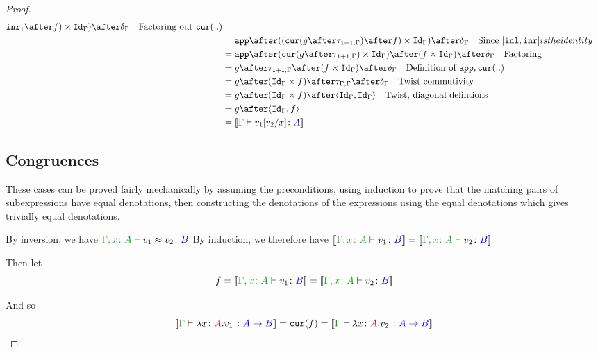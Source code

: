 \documentclass{report}
\begin{document}
\begin{framed}
\begin{proof}
{{\begin{align*}
{                }{
                    \inr_\1
                }\after f)\times \idg)\after\diag{\G}\qt{Factoring out $\cur{..}$}\\
                & = \app\after((\cur{g\after\twist{\1+\1}{\G}}\after f)\times \idg)\after\diag{\G}\qt{Since $\fld{\inl}{\inr} is the identity$}\\
                & = \app\after(\cur{g\after\twist{\1+\1}{\G}}\times \idg)\after (f\times \idg)\after\diag{\G}\qt{Factoring}\\
               & = g\after\twist{\1+\1}{\G} \after (f\times \idg)\after\diag{\G} \qt{Definition of $\app,\cur{..}$}\\
               & = g\after(\idg\times f)\after \twist{\G}{\G} \after\diag{\G} \qt{Twist commutivity}\\
               & = g\after(\idg\times f) \after\pr{\idg}{\idg} \qt{Twist, diagonal defintions} \\
               & = g\after\pr{\idg}{f} \\
               & = \deno{\gtyperelation{v_1\ssub{x}{v_2}}{ A}}
            \end{align*}
            }}
        
        
        \subsection{Congruences}
        These cases can be proved fairly mechanically by assuming the preconditions, using induction to prove that the matching pairs of subexpressions have equal denotations, then constructing the denotations of the expressions using the equal denotations which gives trivially equal denotations.
        
        \case{\eqfun}
            By inversion, we have $\berelation{\gax}{v_1}{v_2}{B}$
            By induction, we therefore have $\deno{\typerelation{\gax}{v_1}{B}} = \deno{\typerelation{\gax}{v_2}{B}}$
        
            Then let
            \begin{equation}
                f = \deno{\typerelation{\gax}{v_1}{B}} = \deno{\typerelation{\gax}{v_2}{B}}
            \end{equation}
        
            And so
            \begin{equation}
                \deno{\gtyperelation{\lam{x}{A}{v_1}}{\ab}} = \cur{f} = \deno{\gtyperelation{\lam{x}{A}{v_2}}{\ab}}
            \end{equation}
        

\end{proof}
\end{framed}
\end{document}
